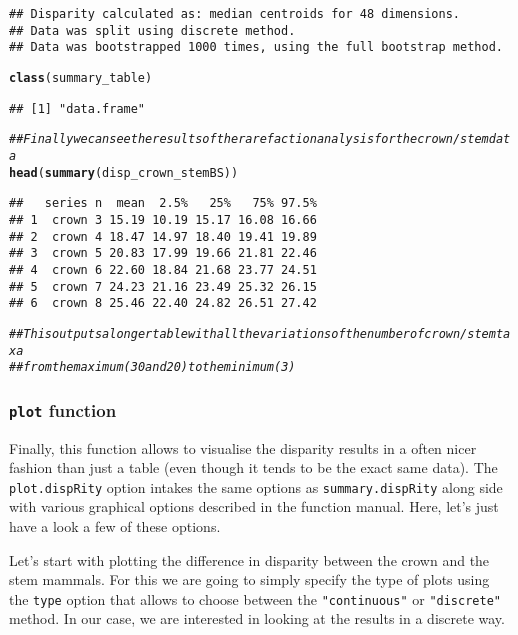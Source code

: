 \documentclass{article}\usepackage[]{graphicx}\usepackage[]{color}
\makeatletter
\newcommand{\hlcom}[1]{\textcolor[rgb]{0.678,0.584,0.686}{\textit{#1}}}%
\newcommand{\hlstd}[1]{\textcolor[rgb]{0.345,0.345,0.345}{#1}}%
\newcommand{\hlkwd}[1]{\textcolor[rgb]{0.737,0.353,0.396}{\textbf{#1}}}%
\newenvironment{kframe}{%
 \def\at@end@of@kframe{}%
 \ifinner\ifhmode%
  \def\at@end@of@kframe{\end{minipage}}%
  \begin{minipage}{\columnwidth}%
 \fi\fi%
 \def\FrameCommand##1{\hskip\@totalleftmargin \hskip-\fboxsep
 \colorbox{shadecolor}{##1}\hskip-\fboxsep
     \hskip-\linewidth \hskip-\@totalleftmargin \hskip\columnwidth}%
 \MakeFramed {\advance\hsize-\width
   \@totalleftmargin\z@ \linewidth\hsize
   \@setminipage}}%
 {\par\unskip\endMakeFramed%
 \at@end@of@kframe}
\newenvironment{knitrout}{}{} %
\makeatother
\begin{document}
\begin{knitrout}
\begin{kframe}
\begin{verbatim}
## Disparity calculated as: median centroids for 48 dimensions.
## Data was split using discrete method.
## Data was bootstrapped 1000 times, using the full bootstrap method.
\end{verbatim}
\begin{alltt}
\hlkwd{class}\hlstd{(summary_table)}
\end{alltt}
\begin{verbatim}
## [1] "data.frame"
\end{verbatim}
\begin{alltt}
\hlcom{## Finally we can see the results of the rarefaction analysis for the crown/stem data}
\hlkwd{head}\hlstd{(}\hlkwd{summary}\hlstd{(disp_crown_stemBS))}
\end{alltt}
\begin{verbatim}
##   series n  mean  2.5%   25%   75% 97.5%
## 1  crown 3 15.19 10.19 15.17 16.08 16.66
## 2  crown 4 18.47 14.97 18.40 19.41 19.89
## 3  crown 5 20.83 17.99 19.66 21.81 22.46
## 4  crown 6 22.60 18.84 21.68 23.77 24.51
## 5  crown 7 24.23 21.16 23.49 25.32 26.15
## 6  crown 8 25.46 22.40 24.82 26.51 27.42
\end{verbatim}
\begin{alltt}
\hlcom{## This outputs a longer table with all the variations of the number of crown/stem taxa}
\hlcom{## from the maximum (30 and 20) to the minimum (3)}
\end{alltt}
\end{kframe}
\end{knitrout}

\subsubsection{\texttt{plot} function}
Finally, this function allows to visualise the disparity results in a often nicer fashion than just a table (even though it tends to be the exact same data).
The \texttt{plot.dispRity} option intakes the same options as \texttt{summary.dispRity} along side with various graphical options described in the function manual.
Here, let's just have a look a few of these options.

Let's start with plotting the difference in disparity between the crown and the stem mammals.
For this we are going to simply specify the type of plots using the \texttt{type} option that allows to choose between the \texttt{"continuous"} or \texttt{"discrete"} method.
In our case, we are interested in looking at the results in a discrete way.
\end{document}

